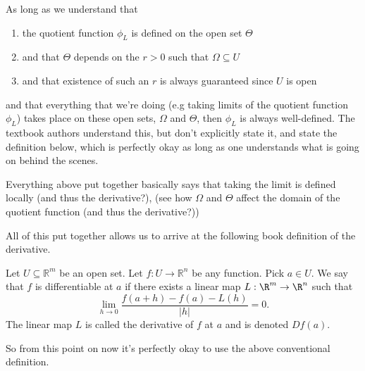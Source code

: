 		\begin{point}
			As long as we understand that 
			
			\begin{enumerate}
				\item the quotient function $\phi_L$ is defined on the open set $\Theta$
				\item  and that $\Theta$ depends on the $r > 0$ such that $\Omega \subseteq U$
				\item  and that existence of such an $r$ is always guaranteed since $U$ is open 
			\end{enumerate}
			and that everything that we're doing (e.g taking limits of the quotient function $\phi_L$) takes place on these open sets, $\Omega$ and $\Theta$, then $\phi_L$ is always well-defined. The textbook authors understand this, but don't explicitly state it, and state the definition below, which is perfectly okay as long as one understands what is going on behind the scenes.
		\end{point}
		
		\begin{point}
			Everything above put together basically says that taking the limit is defined locally (and thus the derivative?), (see how $\Omega$ and $\Theta$ affect the domain of the quotient function (and thus the derivative?))
		\end{point}
		
			
		
		
		All of this put together allows us to arrive at the following book definition of the derivative.
		
		
		\begin{definition}
			Let $U \subseteq \mathbb{R}^m$ be an open set. Let $f : U \to \mathbb{R}^n$ be any function. Pick $a \in U$. We say that $f$ is differentiable at $a$ if there exists a linear map $L : \R^m \to \R^n$ such that $$\lim_{h \to 0}\frac{f(a+h)-f(a)-L(h)}{|h|}=0.$$ The linear map $L$ is called the derivative of $f$ at $a$ and is denoted $Df(a)$.
		\end{definition}
		
		So from this point on now it's perfectly okay to use the above conventional definition.
		
		